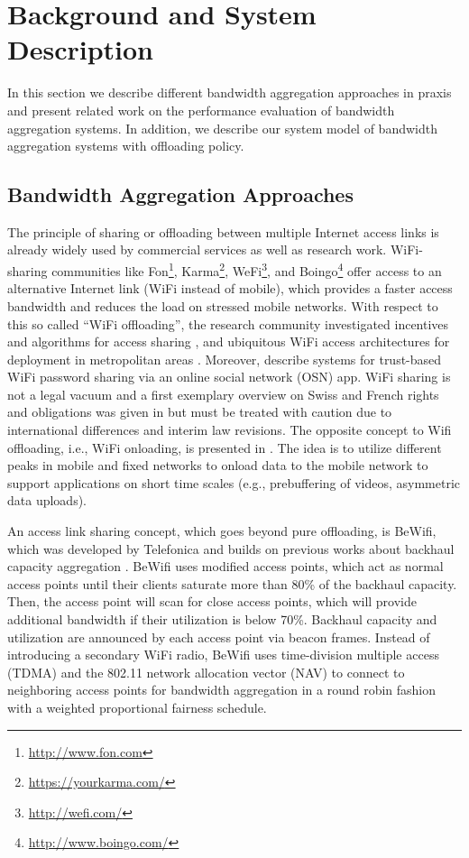 \section{Background and System Description}\label{sec:aggregation:background}
In this section we describe different bandwidth aggregation approaches in praxis and present related work on the performance evaluation of bandwidth aggregation systems.
In addition, we describe our system model of bandwidth aggregation systems with offloading policy.

\subsection{Bandwidth Aggregation Approaches}\label{sec:aggregation:background:aggr}

The principle of sharing or offloading between multiple Internet access links is already widely used by commercial services as well as research work. WiFi-sharing communities like Fon\footnote{\url{http://www.fon.com}}, Karma\footnote{\url{https://yourkarma.com/}}, WeFi\footnote{\url{http://wefi.com/}}, and Boingo\footnote{\url{http://www.boingo.com/}} offer access to an alternative Internet link (WiFi instead of mobile), which provides a faster access bandwidth and reduces the load on stressed mobile networks. With respect to this so called ``WiFi offloading'', the research community investigated incentives and algorithms for access sharing \cite{mamatas2010incentives}, and ubiquitous WiFi access architectures for deployment in metropolitan areas \cite{sastry2007architecting, vidales2009metropolitan}. Moreover, \cite{lafuente2011flexible,donelson2012patent,seufert2013horst} describe systems for trust-based WiFi password sharing via an online social network (OSN) app. WiFi sharing is not a legal vacuum and a first exemplary overview on Swiss and French rights and obligations was given in \cite{camponovo2005wlan} but must be treated with caution due to international differences and interim law revisions.
The opposite concept to Wifi offloading, i.e., WiFi onloading, is presented in \cite{rossi20133gol}. The idea is to utilize different peaks in mobile and fixed networks to onload data to the mobile network to support applications on short time scales (e.g., prebuffering of videos, asymmetric data uploads).

An access link sharing concept, which goes beyond pure offloading, is BeWifi, which was developed by Telefonica \cite{goma2013patent} and builds on previous works about backhaul capacity aggregation \cite{kandula2008fatvap,giustiniano2010fair}. BeWifi uses modified access points, which act as normal access points until their clients saturate more than 80\% of the backhaul capacity. Then, the access point will scan for close access points, which will provide additional bandwidth if their utilization is below 70\%. Backhaul capacity and utilization are announced by each access point via beacon frames. Instead of introducing a secondary WiFi radio, BeWifi uses time-division multiple access (TDMA) and the 802.11 network allocation vector (NAV) to connect to neighboring access points for bandwidth aggregation in a round robin fashion with a weighted proportional fairness schedule.

